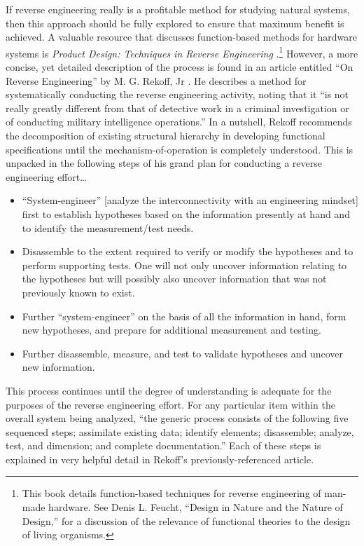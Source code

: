 If reverse engineering really is a profitable method for studying
natural systems, then this approach should be fully explored to ensure
that maximum benefit is achieved. A valuable resource that discusses
function-based methods for hardware systems is \textit{Product Design:
Techniques in Reverse Engineering} \citep{ottowood2001}.\footnote{
This book details function-based
techniques for reverse engineering of man-made hardware. See Denis L.
Feucht, ``Design in Nature and the Nature of Design,''\citep{feucht1999} 
for a discussion of the relevance of
functional theories to the design of living organisms.
} However, a more
concise, yet detailed description of the process is found in an article
entitled ``On Reverse Engineering'' by M. G. Rekoff,
Jr \citep{rekoff1985}. He describes a method for systematically
conducting the reverse engineering activity, noting that it ``is not
really greatly different from that of detective work in a criminal
investigation or of conducting military intelligence
operations.''\citep[][p.~245]{rekoff1985} In a nutshell, Rekoff recommends the
decomposition of existing structural hierarchy in developing functional
specifications until the mechanism-of-operation is completely
understood. This is unpacked in the following steps of his grand plan
for conducting a reverse engineering effort{\ldots}

\begin{itemize}
\item 
``System-engineer'' [analyze the interconnectivity with an engineering
mindset] first to establish hypotheses based on the information
presently at hand and to identify the measurement/test needs.
\item 
Disassemble to the extent required to verify or modify the hypotheses
and to perform supporting tests. One will not only uncover information
relating to the hypotheses but will possibly also uncover information
that was not previously known to exist.
\item 
Further ``system-engineer'' on the basis of all the information in hand,
form new hypotheses, and prepare for additional measurement and
testing.
\item 
Further disassemble, measure, and test to validate hypotheses and
uncover new information.
\end{itemize}

This process continues until the degree of understanding is adequate for
the purposes of the reverse engineering effort. For any particular item
within the overall system being analyzed, “the generic process consists
of the following five sequenced steps; assimilate existing data;
identify elements; disassemble; analyze, test, and dimension; and
complete documentation.” Each of these steps is explained in very
helpful detail in Rekoff’s previously-referenced article.

